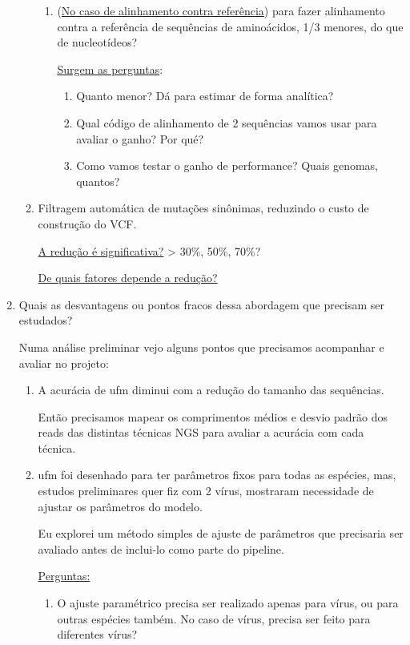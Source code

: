\documentclass[12pt]{article}
\begin{document}
\begin{enumerate}
\begin{enumerate}
\begin{enumerate}
            \item (\underline{No caso de alinhamento contra referência}) para fazer alinhamento contra a referência de sequências de aminoácidos, 1/3 menores, do que de nucleotídeos?
         
        \underline{Surgem as perguntas}:
        \begin{enumerate}
            \item Quanto menor? Dá para estimar de forma analítica?
            \item Qual código de alinhamento de 2 sequências vamos usar para avaliar o ganho? Por qué?
            \item Como vamos testar o ganho de performance? Quais genomas, quantos?
        \end{enumerate} 
    \end{enumerate}
    \item Filtragem automática de mutações sinônimas, reduzindo o custo de construção do VCF.
     
     \underline{A redução é significativa?} > 30\%, 50\%, 70\%? 
        
    \underline{De quais fatores depende a redução?}
\end{enumerate}

\item Quais as desvantagens ou pontos fracos dessa abordagem que precisam ser estudados?

Numa análise preliminar vejo alguns pontos que precisamos acompanhar e avaliar no projeto:
\begin{enumerate}
    \item A acurácia de \gls{ufm} diminui com a redução do tamanho das sequências. 
    
    Então precisamos mapear os comprimentos médios e desvio padrão dos reads das distintas técnicas NGS para avaliar a acurácia com cada técnica. 
    
    \item \gls{ufm} foi desenhado para ter parâmetros fixos para todas as espécies, mas, estudos preliminares quer fiz com 2 vírus, mostraram necessidade de ajustar os parâmetros do modelo.  
    
    Eu explorei um método simples de ajuste de parâmetros que precisaria ser avaliado antes de inclui-lo como parte do pipeline.
    
    \underline{Perguntas:}
    
    \begin{enumerate}
        \item O ajuste paramétrico precisa ser realizado apenas para vírus, ou para outras espécies também. No caso de vírus, precisa ser feito para diferentes vírus?
        

\end{enumerate}
\end{enumerate}
\end{enumerate}
\end{document}
